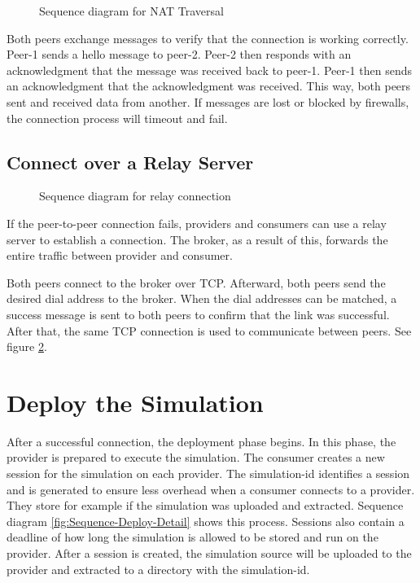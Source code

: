 \begin{figure}[h]
  \centering
  
  \caption{Sequence diagram for NAT Traversal}
  \label{fig:Sequence-NAT-Traversal}
\end{figure}

Both peers exchange messages to verify that the connection is working correctly. Peer-1 sends a hello message to peer-2. Peer-2 then responds with an acknowledgment that the message was received back to peer-1. Peer-1 then sends an acknowledgment that the acknowledgment was received. This way, both peers sent and received data from another. If messages are lost or blocked by firewalls, the connection process will timeout and fail.

\subsection{Connect over a Relay Server}
\label{Connect-over-a-Relay-Server}

\begin{figure}[h]
  \centering
  
  \caption{Sequence diagram for relay connection}
  \label{fig:Sequence-Relay-Server}
\end{figure}

If the peer-to-peer connection fails, providers and consumers can use a relay server to establish a connection. The broker, as a result of this, forwards the entire traffic between provider and consumer.

Both peers connect to the broker over TCP. Afterward, both peers send the desired dial address to the broker. When the dial addresses can be matched, a success message is sent to both peers to confirm that the link was successful. After that, the same TCP connection is used to communicate between peers. See figure \ref{fig:Sequence-Relay-Server}.

\section{Deploy the Simulation}

After a successful connection, the deployment phase begins. In this phase, the provider is prepared to execute the simulation. The consumer creates a new session for the simulation on each provider. The simulation-id identifies a session and is generated to ensure less overhead when a consumer connects to a provider. They store for example if the simulation was uploaded and extracted. Sequence diagram \ref{fig:Sequence-Deploy-Detail} shows this process. Sessions also contain a deadline of how long the simulation is allowed to be stored and run on the provider. After a session is created, the simulation source will be uploaded to the provider and extracted to a directory with the simulation-id. 


